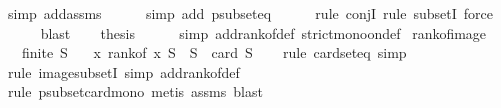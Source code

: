 \begin{isabellebody}
\ {\isacharparenleft}{\kern0pt}simp\ add{\isacharcolon}{\kern0pt}assms{\isacharparenright}{\kern0pt}\isanewline
\ \ \ \ \isamarkupfalse%
\ {\isacharparenleft}{\kern0pt}simp\ add{\isacharcolon}{\kern0pt}\ psubset{\isacharunderscore}{\kern0pt}eq{\isacharparenright}{\kern0pt}\isanewline
\ \ \ \ \isamarkupfalse%
\ {\isacharparenleft}{\kern0pt}rule\ conjI{\isacharcomma}{\kern0pt}\ rule\ subsetI{\isacharcomma}{\kern0pt}\ force{\isacharparenright}{\kern0pt}\isanewline
\ \ \ \ \isamarkupfalse%
\ blast\isanewline
\isanewline
\ \ \isamarkupfalse%
\ {\isacharquery}{\kern0pt}thesis\isanewline
\ \ \ \ \isamarkupfalse%
\ {\isacharparenleft}{\kern0pt}simp\ add{\isacharcolon}{\kern0pt}rank{\isacharunderscore}{\kern0pt}of{\isacharunderscore}{\kern0pt}def\ strict{\isacharunderscore}{\kern0pt}mono{\isacharunderscore}{\kern0pt}on{\isacharunderscore}{\kern0pt}def{\isacharparenright}{\kern0pt}\isanewline
{}\isamarkupfalse%
%
\endisatagproof
{\isafoldproof}%
%
\isadelimproof
\isanewline
%
\endisadelimproof
\isanewline
\isanewline
{}\isamarkupfalse%
\ rank{\isacharunderscore}{\kern0pt}of{\isacharunderscore}{\kern0pt}image{\isacharcolon}{\kern0pt}\isanewline
\ \ \ {\isachardoublequoteopen}finite\ S{\isachardoublequoteclose}\isanewline
\ \ \ {\isachardoublequoteopen}{\isacharparenleft}{\kern0pt}{\isasymlambda}x{\isachardot}{\kern0pt}\ rank{\isacharunderscore}{\kern0pt}of\ x\ S{\isacharparenright}{\kern0pt}\ {\isacharbackquote}{\kern0pt}\ S\ {\isacharequal}{\kern0pt}\ {\isacharbraceleft}{\kern0pt}{}{\isachardot}{\kern0pt}{\isachardot}{\kern0pt}{\isacharless}{\kern0pt}card\ S{\isacharbraceright}{\kern0pt}{\isachardoublequoteclose}\isanewline
%
\isadelimproof
\ \ %
\endisadelimproof
%
\isatagproof
{}\isamarkupfalse%
\ {\isacharparenleft}{\kern0pt}rule\ card{\isacharunderscore}{\kern0pt}seteq{\isacharcomma}{\kern0pt}\ simp{\isacharparenright}{\kern0pt}\isanewline
\ \ \ \isamarkupfalse%
\ {\isacharparenleft}{\kern0pt}rule\ image{\isacharunderscore}{\kern0pt}subsetI{\isacharcomma}{\kern0pt}\ simp\ add{\isacharcolon}{\kern0pt}rank{\isacharunderscore}{\kern0pt}of{\isacharunderscore}{\kern0pt}def{\isacharparenright}{\kern0pt}\isanewline
\ \ \ \isamarkupfalse%
\ {\isacharparenleft}{\kern0pt}rule\ psubset{\isacharunderscore}{\kern0pt}card{\isacharunderscore}{\kern0pt}mono{\isacharcomma}{\kern0pt}\ metis\ assms{\isacharcomma}{\kern0pt}\ blast{\isacharparenright}{\kern0pt}\isanewline

\end{isabellebody}
